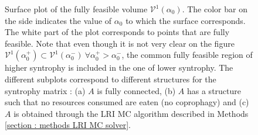 \documentclass[12pt, titlepage]{report}
\begin{document}
\begin{figure}[h!]
\hspace{-0.1\linewidth}
\captionsetup[subfigure]{captionskip = -185pt, margin = 205pt}
\begin{center}
\end{center}
\caption[caption for LOF]{Surface plot of the fully feasible volume $\mathcal{V}^1(\alpha_0)$. The color bar on the side indicates the value of $\alpha_0$ to which the surface corresponds. The white part of the plot corresponds to points that  are fully feasible. Note that even though it is not very clear on the figure $\mathcal{V}^1(\alpha_0^+) \subset \mathcal{V}^1(\alpha_0^-) \ \forall \alpha_0^+ > \alpha_0^-$, \ie the common fully feasible region of higher syntrophy is included in the one of lower syntrophy. The different subplots correspond to different structures for the syntrophy matrix : (a) $A$ is fully connected, (b) $A$ has a structure such that no resources consumed are eaten (no coprophagy) and (c) $A$ is obtained through the LRI MC algorithm described in Methods \ref{section : methods LRI MC solver}.} \label{fig : results feasibility cfv variation with syntrophy}
\end{figure}
\end{document}
